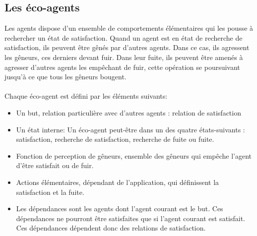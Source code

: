	\subsection{Les éco-agents}
        Les agents dispose d'un ensemble de comportements élémentaires qui les pousse à rechercher un état de satisfaction. Quand un agent est en état de recherche de satisfaction, ils peuvent être gênés par d'autres agents. Dans ce cas, ils agressent les gêneurs, ces derniers devant fuir.  Dans leur fuite, ils peuvent être amenés à agresser d'autres agents les empêchant de fuir, cette opération se poursuivant jusqu'à ce que tous les gêneurs bougent. \\
        \\
        Chaque éco-agent est défini par les éléments suivants:
        \begin{itemize}
        \item Un but, relation particulière avec d'autres agents : relation de satisfaction 
        \item Un état interne:  Un éco-agent peut-être dans un des quatre états-suivants : satisfaction, recherche de satisfaction, recherche de fuite ou fuite. 
        \item Fonction de perception de gêneurs, ensemble des gêneurs qui empêche l'agent d'être satisfait ou de fuir. 
        \item Actions élémentaires, dépendant de l'application, qui définissent la satisfaction et la fuite. 
        \item Les dépendances sont les agents dont l'agent courant est le but. Ces dépendances ne pourront être satisfaites que si l'agent courant est satisfait. Ces dépendances dépendent donc des relations de satisfaction.
        \end{itemize}
        
